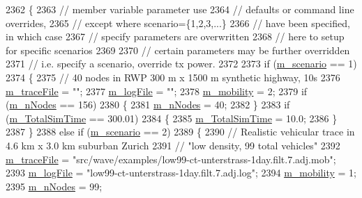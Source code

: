 \begin{DoxyCode}
2362 \{
2363   \textcolor{comment}{// member variable parameter use}
2364   \textcolor{comment}{// defaults or command line overrides,}
2365   \textcolor{comment}{// except where scenario=\{1,2,3,...\}}
2366   \textcolor{comment}{// have been specified, in which case}
2367   \textcolor{comment}{// specify parameters are overwritten}
2368   \textcolor{comment}{// here to setup for specific scenarios}
2369 
2370   \textcolor{comment}{// certain parameters may be further overridden}
2371   \textcolor{comment}{// i.e. specify a scenario, override tx power.}
2372 
2373   \textcolor{keywordflow}{if} (\hyperlink{classVanetRoutingExperiment_aeabf077a592421116de2b2df582471c8}{m\_scenario} == 1)
2374     \{
2375       \textcolor{comment}{// 40 nodes in RWP 300 m x 1500 m synthetic highway, 10s}
2376       \hyperlink{classVanetRoutingExperiment_a71d4ca6c5a1d376e7313ffa30418622e}{m\_traceFile} = \textcolor{stringliteral}{""};
2377       \hyperlink{classVanetRoutingExperiment_a044a4788705e412d45aa057bef38e8c3}{m\_logFile} = \textcolor{stringliteral}{""};
2378       \hyperlink{classVanetRoutingExperiment_a1ab9e6d4a9fcfabb7b6fd820a39f63e3}{m\_mobility} = 2;
2379       \textcolor{keywordflow}{if} (\hyperlink{classVanetRoutingExperiment_ac2bf996dc9fe3163f8a720acbf4f6f85}{m\_nNodes} == 156)
2380         \{
2381           \hyperlink{classVanetRoutingExperiment_ac2bf996dc9fe3163f8a720acbf4f6f85}{m\_nNodes} = 40;
2382         \}
2383       \textcolor{keywordflow}{if} (\hyperlink{classVanetRoutingExperiment_acae630bc30645931dcb68283b0217b1b}{m\_TotalSimTime} == 300.01)
2384         \{
2385           \hyperlink{classVanetRoutingExperiment_acae630bc30645931dcb68283b0217b1b}{m\_TotalSimTime} = 10.0;
2386         \}
2387     \}
2388   \textcolor{keywordflow}{else} \textcolor{keywordflow}{if} (\hyperlink{classVanetRoutingExperiment_aeabf077a592421116de2b2df582471c8}{m\_scenario} == 2)
2389     \{
2390       \textcolor{comment}{// Realistic vehicular trace in 4.6 km x 3.0 km suburban Zurich}
2391       \textcolor{comment}{// "low density, 99 total vehicles"}
2392       \hyperlink{classVanetRoutingExperiment_a71d4ca6c5a1d376e7313ffa30418622e}{m\_traceFile} = \textcolor{stringliteral}{"src/wave/examples/low99-ct-unterstrass-1day.filt.7.adj.mob"};
2393       \hyperlink{classVanetRoutingExperiment_a044a4788705e412d45aa057bef38e8c3}{m\_logFile} = \textcolor{stringliteral}{"low99-ct-unterstrass-1day.filt.7.adj.log"};
2394       \hyperlink{classVanetRoutingExperiment_a1ab9e6d4a9fcfabb7b6fd820a39f63e3}{m\_mobility} = 1;
2395       \hyperlink{classVanetRoutingExperiment_ac2bf996dc9fe3163f8a720acbf4f6f85}{m\_nNodes} = 99;

\end{DoxyCode}
